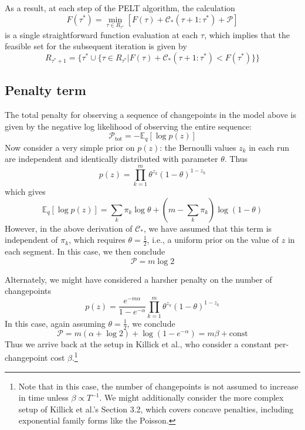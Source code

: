 \documentclass[11pt]{article}
\begin{document}
As a result, at each step of the PELT algorithm, the calculation
\begin{equation}
    F(\tau^*) = \min_{\tau \in R_{\tau^*}} [F(\tau) + \mathcal{C}_*(\tau + 1:\tau^*) + \mathcal{P}]
\end{equation}
is a single straightforward function evaluation at each $\tau$, which implies that the feasible set for the subsequent iteration is given by
\begin{equation}
    R_{\tau^* + 1} = \lbrace \tau^* \cup
    \lbrace
    \tau \in R_{\tau^*} \vert F(\tau) + \mathcal{C}_*(\tau + 1:\tau^*) <
    F(\tau^*)
    \rbrace \rbrace
\end{equation}

\subsection{Penalty term}
The total penalty for observing a sequence of changepoints in the model above is given by the negative log likelihood of observing the entire sequence:
\begin{equation}
    \mathcal{P}_\mathrm{tot} = -\mathbb{E}_q[\log p(z)]
\end{equation}
Now consider a very simple prior on $p(z)$: the Bernoulli values $z_k$ in each run are independent and identically distributed with parameter $\theta$. Thus
\begin{equation}
    p(z) = \prod_{k = 1}^m \theta^{z_k} (1 - \theta)^{1 - z_k}
\end{equation}
which gives
\begin{equation}
    \mathbb{E}_q[\log p(z)] = \sum_k \pi_k \log \theta
    + (m - \sum_k \pi_k)\log (1 - \theta)
\end{equation}
However, in the above derivation of $\mathcal{C}_*$, we have assumed that this term is independent of $\pi_k$, which requires $\theta = \frac{1}{2}$, i.e., a uniform prior on the value of $z$ in each segment. In this case, we then conclude
\begin{equation}
    \mathcal{P} = m \log 2
\end{equation}

Alternately, we might have considered a harsher penalty on the number of changepoints
\begin{equation}
    p(z) = \frac{e^{-m\alpha}}{1 - e^{-\alpha}}
    \prod_{k = 1}^m \theta^{z_k} (1 - \theta)^{1 - z_k}
\end{equation}
In this case, again assuming $\theta = \frac{1}{2}$, we conclude
\begin{equation}
    \mathcal{P} = m(\alpha + \log 2) + \log (1 - e^{-\alpha}) = m\beta + \text{const}
\end{equation}
Thus we arrive back at the setup in Killick et al., who consider a constant per-changepoint cost $\beta$.\footnote{Note that in this case, the number of changepoints is not assumed to increase in time unless $\beta \propto T^{-1}$. We might additionally consider the more complex setup of Killick et al.'s Section 3.2, which covers concave penalties, including exponential family forms like the Poisson.}
\end{document}

